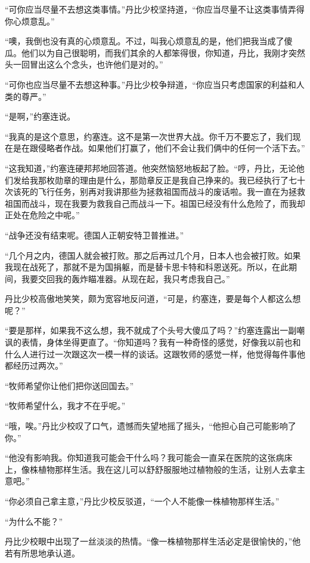     “可你应当尽量不去想这类事情。”丹比少校坚持道，“你应当尽量不让这类事情弄得你心烦意乱。”

    “噢，我倒也没有真的心烦意乱。不过，叫我心烦意乱的是，他们把我当成了傻瓜。他们以为自己很聪明，而我们其余的人都笨得很，你知道，丹比，我刚才突然头一回冒出这么个念头，也许他们是对的。”

    “可你也应当尽量不去想这种事。”丹比少校争辩道，“你应当只考虑国家的利益和人类的尊严。”

    “是啊，”约塞连说。

    “我真的是这个意思，约塞连。这不是第一次世界大战。你千万不要忘了，我们现在是在跟侵略者作战。如果他们打赢了，他们不会让我们俩中的任何一个活下去。”

    “这我知道，”约塞连硬邦邦地回答道。他突然恼怒地板起了脸。“哼，丹比，无论他们发给我那枚勋章的理由是什么，那勋章反正是我自己挣来的。我已经执行了七十次该死的飞行任务，别再对我讲那些为拯救祖国而战斗的废话啦。我一直在为拯救祖国而战斗，现在我要为救我自己而战斗一下。祖国已经没有什么危险了，而我却正处在危险之中呢。”

    “战争还没有结束呢。德国人正朝安特卫普推进。”

    “几个月之内，德国人就会被打败。那之后再过几个月，日本人也会被打败。如果我现在战死了，那就不是为国捐躯，而是替卡思卡特和科恩送死。所以，在此期间，我要交回我的轰炸瞄准器。从现在起，我只考虑我自己。”

    丹比少校高傲地笑笑，颇为宽容地反问道，“可是，约塞连，要是每个人都这么想呢？”

    “要是那样，如果我不这么想，我不就成了个头号大傻瓜了吗？”约塞连露出一副嘲讽的表情，身体坐得更直了。“你知道吗？我有一种奇怪的感觉，好像我以前也和什么人进行过一次跟这次一模一样的谈话。这跟牧师的感觉一样，他觉得每件事他都经历过两次。”

    “牧师希望你让他们把你送回国去。”

    “牧师希望什么，我才不在乎呢。”

    “哦，唉。”丹比少校叹了口气，遗憾而失望地摇了摇头，“他担心自己可能影响了你。”

    “他没有影响我。你知道我可能会干什么吗？我可能会一直呆在医院的这张病床上，像株植物那样生活。我在这儿可以舒舒服服地过植物般的生活，让别人去拿主意吧。”

    “你必须自己拿主意，”丹比少校反驳道，“一个人不能像一株植物那样生活。”

    “为什么不能？”

    丹比少校眼中出现了一丝淡淡的热情。“像一株植物那样生活必定是很愉快的，”他若有所思地承认道。

